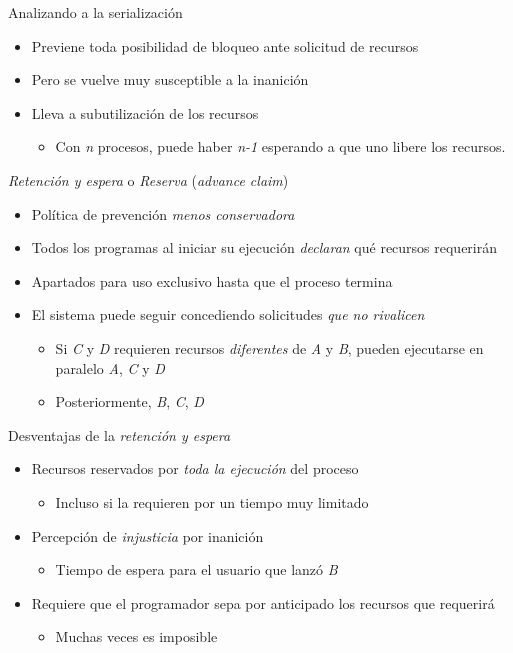 \documentclass[presentation]{beamer}
\begin{document}
\begin{frame}[label={sec:org53e8197}]{Analizando a la serialización}
\begin{itemize}
\item Previene toda posibilidad de bloqueo ante solicitud de recursos
\item Pero se vuelve muy susceptible a la inanición
\item Lleva a subutilización de los recursos
\begin{itemize}
\item Con \emph{n} procesos, puede haber \emph{n-1} esperando a que uno libere los
recursos.
\end{itemize}
\end{itemize}
\end{frame}

\begin{frame}[label={sec:org8a905ea}]{\emph{Retención y espera} o \emph{Reserva} (\emph{advance claim})}
\begin{itemize}
\item Política de prevención \emph{menos conservadora}
\item Todos los programas al iniciar su ejecución \emph{declaran} qué recursos
requerirán
\item Apartados para uso exclusivo hasta que el proceso termina
\item El sistema puede seguir concediendo solicitudes \emph{que no rivalicen}
\begin{itemize}
\item Si \emph{C} y \emph{D} requieren recursos \emph{diferentes} de \emph{A} y \emph{B}, pueden
ejecutarse en paralelo \emph{A}, \emph{C} y \emph{D}
\item Posteriormente, \emph{B}, \emph{C}, \emph{D}
\end{itemize}
\end{itemize}
\end{frame}

\begin{frame}[label={sec:org2f69b4a}]{Desventajas de la \emph{retención y espera}}
\begin{itemize}
\item Recursos reservados por \emph{toda la ejecución} del proceso
\begin{itemize}
\item Incluso si la requieren por un tiempo muy limitado
\end{itemize}
\item Percepción de \emph{injusticia} por inanición
\begin{itemize}
\item Tiempo de espera para el usuario que lanzó \emph{B}
\end{itemize}
\item Requiere que el programador sepa por anticipado los recursos que requerirá
\begin{itemize}
\item Muchas veces es imposible
\end{itemize}
\end{itemize}
\end{frame}
\end{document}
